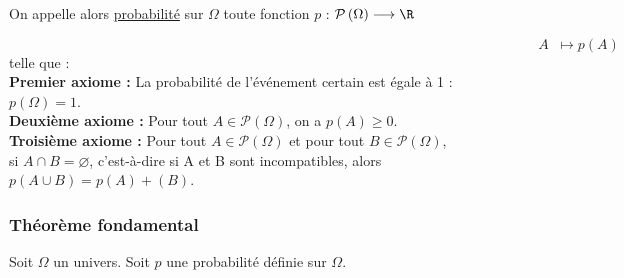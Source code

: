 On appelle alors \underline{probabilité} sur $\Omega$ toute fonction $p$ : $\mathcal{P}\left (\Omega\right ) \longrightarrow \R $

$\;  \;  \;  \;  \;  \;  \;  \;  \;  \; \;  \;  \;  \;  \; \; \; \;   \;  \;  \;  \; \;  \;  \;  \;  \;  \;  \;  \;  \;  \; \;  \;  \;  \;  \;  \;  \;  \;  \;  \;  \;  \;  \;  \;  \;  \;  \;  \; \; \; \; \; \; \; \; \; \; \; \; \;  \;  \;  \; \;  \;  \;  \;  \;  \;  \;  \;  \;  \; \;  \;  \;  \;  \;  \;  \;  \;  \;  \;  \;  \;  \; \;  \;  \;  \;  \;  \;  \;  \;  \;  \; \;  \;  \;  \;  \;  \;  \;  \;  \;  \; \;  \;  \;  \;  \;  \;  \;  \;  \;  \; \;  \;  \;  \;  \;  \;  \;  \;  \;  \; \;  \;  \;  \;  \;  \;  \;  \; A  \;  \; \longmapsto p\left (A\right )$ \\

telle que : \\

\textbf{Premier axiome :} La probabilité de l'événement certain est égale à 1 : $p\left(\Omega\right) = 1$. \\

\textbf{Deuxième axiome : } Pour tout $A \in \mathcal{P}\left (\Omega\right )$, on a $ p\left(A\right) \geqslant 0$. \\

\textbf{Troisième axiome :} Pour tout $A \in \mathcal{P}\left (\Omega\right )$ et pour tout $B \in \mathcal{P}\left (\Omega\right )$,  \\ si $A \cap B = \varnothing$, c'est-à-dire si A et B sont incompatibles, alors $p\left(A\cup B\right) = p \left(A\right) + \left(B \right)$.

\subsubsection{Théorème fondamental}

Soit $\Omega$ un univers. Soit $p$ une probabilité définie sur $\Omega$. \\

